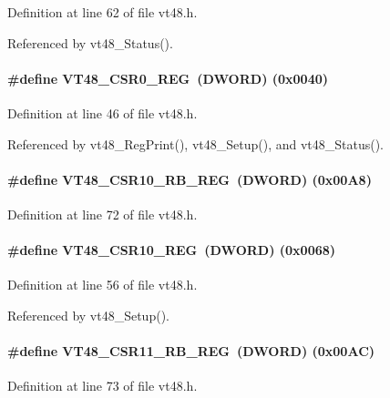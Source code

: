 Definition at line 62 of file vt48.h.

Referenced by vt48\_\-Status().
\paragraph[{VT48\_\-CSR0\_\-REG}]{\setlength{\rightskip}{0pt plus 5cm}\#define VT48\_\-CSR0\_\-REG~({\bf DWORD}) (0x0040)}\hfill\label{vt48_8h_a76b4cbb28d8ed3651964ef7d3f9da099}


Definition at line 46 of file vt48.h.

Referenced by vt48\_\-RegPrint(), vt48\_\-Setup(), and vt48\_\-Status().
\paragraph[{VT48\_\-CSR10\_\-RB\_\-REG}]{\setlength{\rightskip}{0pt plus 5cm}\#define VT48\_\-CSR10\_\-RB\_\-REG~({\bf DWORD}) (0x00A8)}\hfill\label{vt48_8h_a1115fd86ec87e7e86bbde581651ea240}


Definition at line 72 of file vt48.h.
\paragraph[{VT48\_\-CSR10\_\-REG}]{\setlength{\rightskip}{0pt plus 5cm}\#define VT48\_\-CSR10\_\-REG~({\bf DWORD}) (0x0068)}\hfill\label{vt48_8h_aee8295d2d385ff6fcda26da2ecec872c}


Definition at line 56 of file vt48.h.

Referenced by vt48\_\-Setup().
\paragraph[{VT48\_\-CSR11\_\-RB\_\-REG}]{\setlength{\rightskip}{0pt plus 5cm}\#define VT48\_\-CSR11\_\-RB\_\-REG~({\bf DWORD}) (0x00AC)}\hfill\label{vt48_8h_a30018c33cfd2d5ed5ee0c461deb532d7}


Definition at line 73 of file vt48.h.
